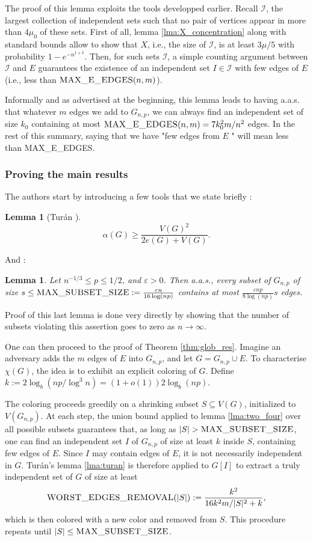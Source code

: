 \documentclass[10pt,journal,a4paper]{IEEEtran}
\newtheorem{lemma}[theorem]{Lemma}
\theoremstyle{definition}   %
\begin{document}
The proof of this lemma exploits the tools developped earlier. Recall $\mathcal{I}$, the largest collection of independent sets such that no pair of vertices appear in more than $4\mu_0$ of these sets. First of all, lemma \ref{lma:X_concentration} along with standard bounds allow to show that $X$, i.e., the size of $\mathcal{I}$, is at least $3 \mu / 5$ with probability $1 - e^{-n^{1 + \delta}}$. Then, for such sets $\mathcal{I}$, a simple counting argument between $\mathcal{I}$ and $E$ guarantees the existence of an independent set $I \in \mathcal{I}$ with few edges of $E$  (i.e., less than $\textsc{MAX\_E\_EDGES}(n, m)$).

Informally and as advertised at the beginning, this lemma leads to having a.a.s. that whatever $m$ edges we add to $G_{n, p}$, we can always find an independent set of size $k_0$ containing at most  $\textsc{MAX\_E\_EDGES}(n, m) = 7k_0^2  m / n^2 $ edges. In the rest of this summary, saying that we have "few edges from $E$ " will mean less than \textsc{MAX\_E\_EDGES}.
\subsubsection{Proving the main results}

The authors start by introducing a few tools that we state briefly :
\begin{lemma}[Tur\'an \cite{proba_method}]
$$
\alpha(G) \ge \frac{V(G)^2 }{2 e(G) + V(G)}.
\label{lma:turan}
$$ 	
\end{lemma}
And :
\begin{lemma}
	Let $n^{-1 /3} \leq p \leq 1 / 2$, and $\varepsilon > 0$. Then a.a.s., every subset of $G_{n, p}$ of size $s \leq \textsc{MAX\_SUBSET\_SIZE} := \frac{\varepsilon n}{16 \log (np)}$ contains at most $\frac{\varepsilon np}{8 \log (np)} s$ edges.
	\label{lma:max_edges}
\end{lemma}
Proof of this last lemma is done very directly by showing that the number of subsets violating this assertion goes to zero as $n \to \infty$.

One can then proceed to the proof of Theorem \ref{thm:glob_res}. Imagine an adversary adds the $m$ edges of $E$ into $G_{n, p}$, and let $G = G_{n,p} \cup E$. To characterise $\chi(G)$, the idea is to exhibit an explicit coloring of $G$. Define $k := 2\log_b(np/\log^3 n) = (1+o(1)) 2\log_b(np)$.

The coloring proceeds greedily on a shrinking subset $S \subseteq V(G)$, initialized to $V(G_{n,p})$. At each step, the union bound applied to lemma \ref{lma:two_four} over all possible subsets guarantees that, as long as $|S| > \textsc{MAX\_SUBSET\_SIZE}$, one can find an independent set $I$ of $G_{n,p}$ of size at least $k$ inside $S$, containing few edges of $E$. Since $I$ may contain edges of $E$, it is not necessarily independent in $G$. Turán's lemma \ref{lma:turan} is therefore applied to $G[I]$ to extract a truly independent set of $G$ of size at least 
$$
\textsc{WORST\_EDGES\_REMOVAL}(|S|) := \frac{k^2}{16k^2m/|S|^2 + k},
$$
which is then colored with a new color and removed from $S$. This procedure repeats until $|S| \leq \textsc{MAX\_SUBSET\_SIZE}$.
\end{document}

